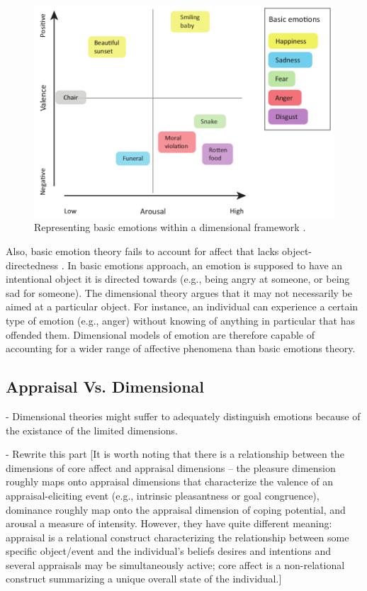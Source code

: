 \documentclass[11pt]{article}
\begin{document}
\begin{figure}[tbh]
  \center
  \includegraphics[width=.9\textwidth]{figure/dimensional-discrete.png}
  \caption{Representing basic emotions within a dimensional framework
  \cite{hamann:mapping-discrete-dimensional}.}
  \label{fig:dimensional-discrete}
\end{figure}

Also, basic emotion theory fails to account for affect that lacks
object-directedness \cite{russell:core-affect}. In basic emotions approach, an
emotion is supposed to have an intentional object it is directed towards (e.g.,
being angry at someone, or being sad for someone). The dimensional theory argues
that it may not necessarily be aimed at a particular object. For instance, an
individual can experience a certain type of emotion (e.g., anger) without
knowing of anything in particular that has offended them. Dimensional models of
emotion are therefore capable of accounting for a wider range of affective
phenomena than basic emotions theory.

\subsection{Appraisal Vs. Dimensional}

- Dimensional theories might suffer to adequately distinguish emotions because
of the existance of the limited dimensions.

- Rewrite this part [It is worth noting that there is a relationship between the
dimensions of core affect and appraisal dimensions – the pleasure dimension
roughly maps onto appraisal dimensions that characterize the valence of an
appraisal-eliciting event (e.g., intrinsic pleasantness or goal congruence),
dominance roughly map onto the appraisal dimension of coping potential, and
arousal a measure of intensity. However, they have quite different meaning:
appraisal is a relational construct characterizing the relationship between some
specific object/event and the individual’s beliefs desires and intentions and
several appraisals may be simultaneously active; core affect is a non-relational
construct summarizing a unique overall state of the individual.]
\end{document}
